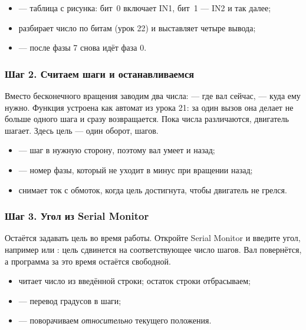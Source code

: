 \begin{itemize}[leftmargin=*]
  \item {} --- таблица с рисунка: бит~0 включает IN1, бит~1 --- IN2 и так далее;
  \item {} разбирает число по битам (урок 22) и выставляет четыре вывода;
  \item {} --- после фазы 7 снова идёт фаза 0.
\end{itemize}

\subsubsection{Шаг 2. Считаем шаги и останавливаемся}

Вместо бесконечного вращения заводим два числа:  --- где вал сейчас,  ---
куда ему нужно. Функция  устроена как автомат из урока 21: за один вызов она делает
не больше одного шага и сразу возвращается. Пока числа различаются, двигатель шагает.
Здесь цель --- один оборот,  шагов.


\begin{itemize}[leftmargin=*]
  \item {} --- шаг в нужную сторону, поэтому вал умеет и назад;
  \item {} --- номер фазы, который не уходит в минус при вращении назад;
  \item {} снимает ток с обмоток, когда цель достигнута, чтобы двигатель не грелся.
\end{itemize}

\subsubsection{Шаг 3. Угол из Serial Monitor}

Остаётся задавать цель во время работы. Откройте Serial Monitor и введите угол, например  или
: цель сдвинется на соответствующее число шагов. Вал повернётся, а программа за это время
остаётся свободной.


\begin{itemize}[leftmargin=*]
  \item {} читает число из введённой строки; остаток строки отбрасываем;
  \item {} --- перевод градусов в шаги;
  \item {} --- поворачиваем \emph{относительно} текущего положения.
\end{itemize}

